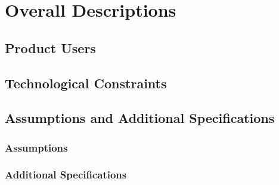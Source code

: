   \section{Overall Descriptions}
   \subsection{Product Users}
   
   \subsection{Technological Constraints}
   
   \subsection{Assumptions and Additional Specifications}

   \subsubsection{Assumptions}

   \subsubsection{Additional Specifications}